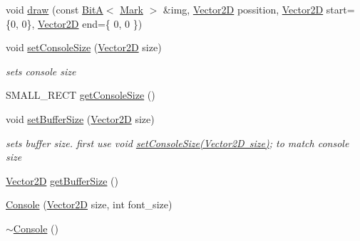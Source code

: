 \begin{DoxyCompactItemize}
\item 
void \mbox{\hyperlink{classsc_1_1_console_a7d0da8266093966f6c7e632bd5f6ccb8}{draw}} (const \mbox{\hyperlink{classsc_1_1_bit_a}{BitA}}$<$ \mbox{\hyperlink{classsc_1_1_mark}{Mark}} $>$ \&img, \mbox{\hyperlink{classsc_1_1_vector2_d}{Vector2D}} possition, \mbox{\hyperlink{classsc_1_1_vector2_d}{Vector2D}} start=\{0, 0\}, \mbox{\hyperlink{classsc_1_1_vector2_d}{Vector2D}} end=\{ 0, 0 \})
\item 
void \mbox{\hyperlink{classsc_1_1_console_ab503eab53751fde4f1e27c6f6901e794}{set\+Console\+Size}} (\mbox{\hyperlink{classsc_1_1_vector2_d}{Vector2D}} size)
\begin{DoxyCompactList}\small\item\em sets console size \end{DoxyCompactList}\item 
S\+M\+A\+L\+L\+\_\+\+R\+E\+CT \mbox{\hyperlink{classsc_1_1_console_af24d25c708971e7ced68c768945c3e2f}{get\+Console\+Size}} ()
\item 
void \mbox{\hyperlink{classsc_1_1_console_abc2f735f5b6f81a6356b4cd26f237ade}{set\+Buffer\+Size}} (\mbox{\hyperlink{classsc_1_1_vector2_d}{Vector2D}} size)
\begin{DoxyCompactList}\small\item\em sets buffer size. first use void \mbox{\hyperlink{classsc_1_1_console_ab503eab53751fde4f1e27c6f6901e794}{set\+Console\+Size(\+Vector2\+D size)}}; to match console size \end{DoxyCompactList}\item 
\mbox{\hyperlink{classsc_1_1_vector2_d}{Vector2D}} \mbox{\hyperlink{classsc_1_1_console_a80a3d34908aa888b1580de2ff6c8987f}{get\+Buffer\+Size}} ()
\item 
\mbox{\hyperlink{classsc_1_1_console_a37b15f73f72773e876927d5290d49780}{Console}} (\mbox{\hyperlink{classsc_1_1_vector2_d}{Vector2D}} size, int font\+\_\+size)
\item 
\mbox{\hyperlink{classsc_1_1_console_a32e8c79c8579b1b076e53848c540d4e7}{$\sim$\+Console}} ()
\end{DoxyCompactItemize}
